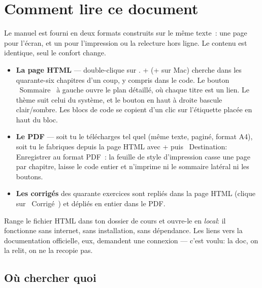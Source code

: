 \section{Comment lire ce document}

Le manuel est fourni en deux formats construits sur le m\^eme texte~: une page
 pour l'\'ecran, et un  pour l'impression ou la relecture
hors ligne. Le contenu est identique, seul le confort change.

\begin{itemize}
  \item \textbf{La page HTML} --- double-clique sur .
        + (+ sur Mac) cherche dans les quarante-six
        chapitres d'un coup, y compris dans le code. Le bouton \og ~Sommaire~ \fg{} \`a gauche
        ouvre le plan d\'etaill\'e, o\`u chaque titre est un lien. Le th\`eme suit celui du
        syst\`eme, et le bouton en haut \`a droite bascule clair/sombre. Les blocs de code se
        copient d'un clic sur l'\'etiquette plac\'ee en haut du bloc.
  \item \textbf{Le PDF} --- soit tu le t\'el\'echarges tel quel (m\^eme texte, pagin\'e, format A4),
        soit tu le fabriques depuis la page HTML avec + puis \og ~Destination:
        Enregistrer au format PDF~\fg{}: la feuille de style d'impression casse une page par
        chapitre, laisse le code entier et n'imprime ni le sommaire lat\'eral ni les boutons.
  \item \textbf{Les corrig\'es} des quarante exercices sont repli\'es dans la page HTML (clique
        sur \og ~Corrig\'e~\fg) et d\'epli\'es en entier dans le PDF.
\end{itemize}

\begin{astuce}
Range le fichier HTML dans ton dossier de cours et ouvre-le en \emph{local}: il fonctionne sans
internet, sans installation, sans d\'ependance. Les liens vers la documentation officielle, eux,
demandent une connexion --- c'est voulu: la doc, on la relit, on ne la recopie pas.
\end{astuce}

\subsection{O\`u chercher quoi}

